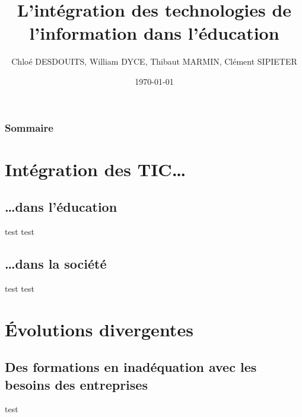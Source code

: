 \documentclass[utf8]{beamer}
\title{L'intégration des technologies de l'information dans l'éducation}
\author{Chloé DESDOUITS, William DYCE, Thibaut MARMIN, Clément SIPIETER}
\date{\today}
\begin{document}
\frame[plain]{\titlepage}

\begin{frame}[plain]
	\frametitle{Sommaire}
	\tableofcontents
\end{frame} 



\section{Intégration des TIC\ldots}

\subsection{\ldots dans l'éducation}

\begin{frame}{test}
test
\end{frame}

\subsection{\ldots dans la société}

\begin{frame}{test}
test
\end{frame}



\section{Évolutions divergentes}

\subsection{Des formations en inadéquation avec les besoins des entreprises}

\begin{frame}{test}
\end{frame}
\end{document}
